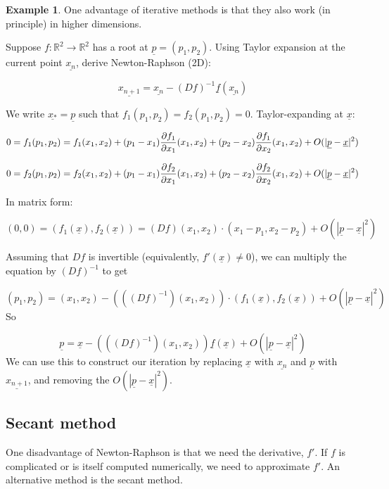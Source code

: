 \documentclass[12pt,a4paper]{article}
\theoremstyle{definition}
\newtheorem{example}[definition]{Example}
\begin{document}
\begin{example}
	One advantage of iterative methods is that they also work (in principle) in higher dimensions.

	Suppose $f: \mathbb{R}^2 \rightarrow \mathbb{R}^2$ has a root at $\underline{p} = (p_1, p_2)$. Using Taylor expansion at the current point $\underline{x_n}$, derive Newton-Raphson (2D):

	\[\underline{x_{n + 1}} = \underline{x_n} - (Df)^{-1} \underline{f}(\underline{x_n})\]

	We write $\underline{x_*} = \underline{p}$ such that $f_1(p_1, p_2) = f_2(p_1, p_2) = 0$. Taylor-expanding at $\underline{x}$:

	\[0 = f_1(p_1, p_2) = f_1(x_1, x_2) + (p_1 - x_1) \diffp{f_1}{x_1} (x_1, x_2) + (p_2 - x_2) \diffp{f_1}{x_2} (x_1, x_2) + O(|\underline{p} - \underline{x}|^2)\]

	\[0 = f_2(p_1, p_2) = f_2(x_1, x_2) + (p_1 - x_1) \diffp{f_2}{x_1} (x_1, x_2) + (p_2 - x_2) \diffp{f_2}{x_2} (x_1, x_2) + O(|\underline{p} - \underline{x}|^2)\]

	In matrix form:

	\[(0, 0) = (f_1(\underline{x}), f_2(\underline{x})) = (Df)(x_1, x_2) \cdot (x_1 - p_1, x_2 - p_2) + O(|\underline{p} - \underline{x}|^2)\]

	Assuming that $Df$ is invertible (equivalently, $f'(\underline{x}) \ne 0$), we can multiply the equation by $(Df)^{-1}$ to get

	\[ (p_1, p_2) = (x_1, x_2) - (((Df)^{-1})(x_1, x_2)) \cdot (f_1(\underline{x}), f_2(\underline{x})) + O(|\underline{p} - \underline{x}|^2)\] So
	
	\[\underline{p} = \underline{x} - (((Df)^{-1})(x_1, x_2)) \underline{f}(\underline{x}) + O(|\underline{p} - \underline{x}|^2) \] We can use this to construct our iteration by replacing $\underline{x}$ with $\underline{x_n}$ and $\underline{p}$ with $\underline{x_{n + 1}}$, and removing the $O(|\underline{p} - \underline{x}|^2)$.
\end{example}

\subsection{Secant method}

One disadvantage of Newton-Raphson is that we need the derivative, $f'$. If $f$ is complicated or is itself computed numerically, we need to approximate $f'$. An alternative method is the secant method.
\end{document}
